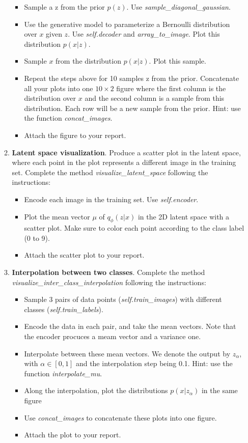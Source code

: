 \begin{Q}
\begin{enumerate}
\begin{enumerate}
\begin{itemize}
\item Sample a z from the prior $p(z)$. Use \textit{sample\_diagonal\_gaussian}.
\item Use the generative model to parameterize a Bernoulli distribution over $x$ given $z$. Use \textit{self.decoder} and \textit{array\_to\_image}. Plot this distribution $p(x|z)$.
\item Sample $x$ from the distribution $p(x|z)$. Plot this sample.
\item Repeat the steps above for 10 samples z from the prior. Concatenate all your plots into one $10\times2$ figure where the first column is the distribution over $x$ and the second column is a sample from this distribution. Each row will be a new sample from the prior. Hint: use the function \textit{concat\_images}.
\item Attach the figure to your report.
\end{itemize}
\item \textbf{Latent space visualization}. Produce a scatter plot in the latent space, where each point in the plot represents a different image in the training set. Complete the method \textit{visualize\_latent\_space} following the instructions:
\begin{itemize}
\item  Encode each image in the training set. Use \textit{self.encoder}.
\item Plot the mean vector $\mu$ of $q_{\phi}(z|x)$ in the 2D latent space with a scatter plot. Make sure to color each point according to the class label (0 to 9). 
\item Attach the scatter plot to your report.
\end{itemize}
\item  \textbf{Interpolation between two classes}. Complete the method \textit{visualize\_inter\_class\_interpolation} following the instructions:
\begin{itemize}
\item  Sample 3 pairs of data points (\textit{self.train\_images}) with different classes (\textit{self.train\_labels}).
\item  Encode the data in each pair, and take the mean vectors. Note that the encoder procuces a meam vector and a variance one.
\item  Interpolate between these mean vectors. We denote the output by $z_{\alpha}$, with $\alpha \in [0,1]$ and the interpolation step being 0.1. Hint:  use the function \textit{interpolate\_mu}.
\item Along the interpolation, plot the distributions $p(x|z_{\alpha})$ in the same figure
\item Use \textit{concat\_images} to concatenate these plots into one figure.
\item Attach the plot to your report.
\end{itemize}
\end{enumerate}

\end{enumerate}


\end{Q}
          

            